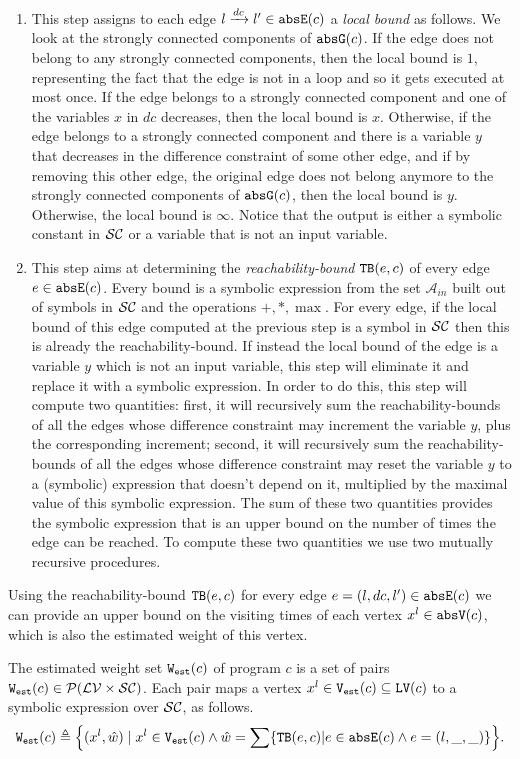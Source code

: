 \begin{enumerate}
\item This step assigns to each edge  $l \xrightarrow{dc} l'\in \mathtt{abs}{\mathtt{E}}(c)$ a \emph{local bound} as follows. We look at the strongly connected components of $\mathtt{abs}{\mathtt{G}}(c)$. If the edge does not belong to any strongly connected components, then the local bound is $1$, representing the fact that the edge is not in a loop and so it gets executed at most once. If the edge belongs to a strongly connected component and one of the variables $x$ in $dc$ decreases, then the local bound is $x$. Otherwise, if the edge belongs to a strongly connected component and there is a variable $y$ that decreases in the difference constraint of some other edge, and if by removing this other edge, the original edge does not belong anymore to the strongly connected components of $\mathtt{abs}{\mathtt{G}}(c)$, then the local bound is $y$. Otherwise, the local bound is $\infty$. Notice that the output is either a symbolic constant in $\mathcal{SC}$ or a variable that is not an input variable.
\item This step aims at determining the \emph{reachability-bound} ${\mathtt{TB}}(e, c)$ of every edge $e \in \mathtt{abs}{\mathtt{E}}(c)$. Every bound is a symbolic expression from the set $\mathcal{A}_{in}$ built out of symbols in $\mathcal{SC}$ and the operations $+, *, \max$. For every edge, if the local bound of this edge computed at the previous step is a symbol in $\mathcal{SC}$ then this is already the reachability-bound. If instead the local bound of the edge is a variable $y$ which is not an input variable, this step will eliminate it and replace it with a symbolic expression. In order to do this, this step will compute two quantities: first, it will recursively sum the reachability-bounds of all the edges whose difference constraint may increment the variable $y$, plus the corresponding increment; second, it will recursively sum the reachability-bounds of all the edges whose difference constraint may reset the variable $y$ to a (symbolic) expression that doesn't depend on it, multiplied by the maximal value of this symbolic expression. The sum of these two quantities provides the symbolic expression that is an upper bound on the number of times the edge can be reached. To compute these two quantities we use two mutually recursive procedures.
\end{enumerate}
  Using the reachability-bound ${\mathtt{TB}}(e, c)$ for every edge $e = (l, dc, l') \in \mathtt{abs}{\mathtt{E}}(c)$ we can provide an upper bound on the visiting times of each vertex $x^l \in \mathtt{abs}{\mathtt{V}}(c)$,
  which is also the estimated weight of this vertex.
\begin{defn}
 \label{def:adaptfun-weight}
The estimated weight set $\mathtt{{W_{est}}}(c)$ of program $c$ is a set of pairs $\mathtt{{W_{est}}}(c) \in \mathcal{P}(\mathcal{LV} \times \mathcal{SC})$.
Each pair maps
a vertex $x^l \in\mathtt{{V_{est}}}(c)\subseteq  \mathtt{LV}(c)$ to a symbolic expression over $\mathcal{SC}$,
as follows.
 \[
 \progW(c) \triangleq
 \left\{ (x^l, \hat{w}) 
\mid
x^l \in \progV(c) 
\land 
\hat{w} = 
\sum\left\{ \absclr(e, c) \middle\vert e \in \absE(c) \land e = (l, \_, \_) \right\}
\right\}.
\]
\end{defn}
%

